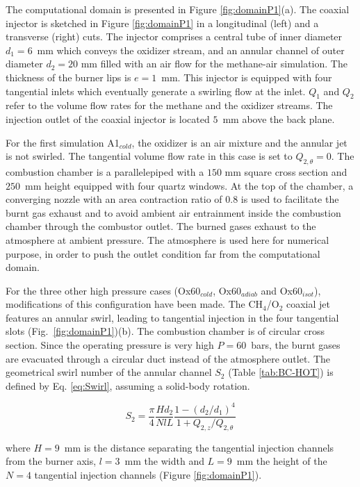 \documentclass[twocolumn,10pt]{asme2e}
\begin{document}
The computational domain is presented in Figure \ref{fig:domainP1}(a). The coaxial injector is sketched in Figure \ref{fig:domainP1} in a longitudinal (left) and a transverse (right) cuts. The injector comprises a central tube of inner diameter $d_1 = 6$~mm which conveys the oxidizer stream, and an annular channel of outer diameter $d_2 = 20$ mm filled with an air flow for the methane-air simulation. The thickness of the burner lips is $e = 1$~mm. This injector is equipped with four tangential inlets which eventually generate a swirling flow at the inlet. $Q_1$ and $Q_2$ refer to the volume flow rates for the methane and the oxidizer streams. The injection outlet of the coaxial injector is located $5$~mm above the back plane.

For the first simulation A1$_{cold}$, the oxidizer is an air mixture and the annular jet is not swirled. The tangential volume flow rate in this case is set to $Q_{2,\theta}=0$. The combustion chamber is a parallelepiped with a $150$ mm square cross section and $250$~mm height equipped with four quartz windows. At the top of the chamber, a converging nozzle with an area contraction ratio of 0.8 is used to facilitate the burnt gas exhaust and to avoid ambient air entrainment inside the combustion chamber through the combustor outlet. The burned gases exhaust to the atmosphere at ambient pressure. The atmosphere is used here for numerical purpose, in order to push the outlet condition far from the computational domain.


For the three other high pressure cases (Ox60$_{cold}$, Ox60$_{adiab}$ and Ox60$_{isot}$), modifications of this configuration have been made. The CH$_4$/O$_2$ coaxial jet features an annular swirl, leading to tangential injection in the four tangential slots (Fig.~\ref{fig:domainP1})(b). The combustion chamber is of circular cross section. Since the operating pressure is very high $P=60$~bars, the burnt gases are evacuated through a circular duct instead of the atmosphere outlet. The geometrical swirl number of the annular channel $S_2$ (Table \ref{tab:BC-HOT}) is defined by Eq. \ref{eq:Swirl}, assuming a solid-body rotation.

\begin{equation}
\label{eq:Swirl}
S_2 = \frac{\pi}{4} \frac{Hd_2}{NlL} \frac{1-(d_2/d_1)^4}{1+Q_{2,z}/Q_{2,\theta}}  
\end{equation} 

where $H=9$~mm is the distance separating the tangential injection channels from the burner axis, $l=3$~mm the width and $L=9$~mm the height of the $N=4$ tangential injection channels (Figure \ref{fig:domainP1}).
\end{document}
